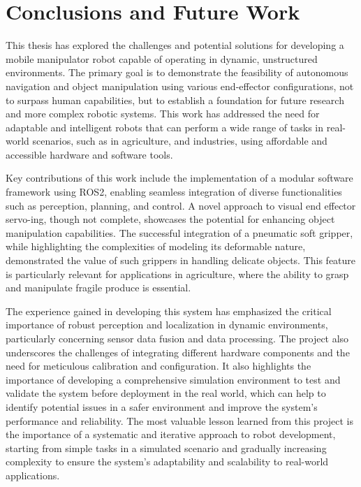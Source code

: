 \chapter{Conclusions and Future Work}

This thesis has explored the challenges and potential solutions for developing a mobile manipulator robot
capable of operating in dynamic, unstructured environments. The primary goal is to demonstrate the feasibility 
of autonomous navigation and object manipulation using various end-effector configurations, not to surpass human capabilities, 
but to establish a foundation for future research and more complex robotic systems. This work has addressed the
need for adaptable and intelligent robots that can perform a wide range of tasks in real-world scenarios,
such as in agriculture, and industries, using affordable and accessible hardware and software tools.

Key contributions of this work include the implementation of a modular software framework using ROS2, enabling seamless 
integration of diverse functionalities such as perception, planning, and control. A novel approach to visual 
end effector servo-ing, though not complete, showcases the potential for enhancing object manipulation capabilities. 
The successful integration of a pneumatic soft gripper, while highlighting the complexities of modeling its deformable nature,
demonstrated the value of such grippers in handling delicate objects. This feature is particularly relevant for
applications in agriculture, where the ability to grasp and manipulate fragile produce is essential.

The experience gained in developing this system has emphasized the critical importance of robust perception and localization 
in dynamic environments, particularly concerning sensor data fusion and data processing. The project also underscores 
the challenges of integrating different hardware components and the need for meticulous calibration and configuration.
It also highlights the importance of developing a comprehensive simulation environment to test and validate the system
before deployment in the real world, which can help to identify potential issues in a safer environment 
and improve the system's performance and reliability. The most valuable lesson learned from this project is the importance
of a systematic and iterative approach to robot development, starting from simple tasks in a simulated scenario
and gradually increasing complexity to ensure the system's adaptability and scalability to real-world applications.

